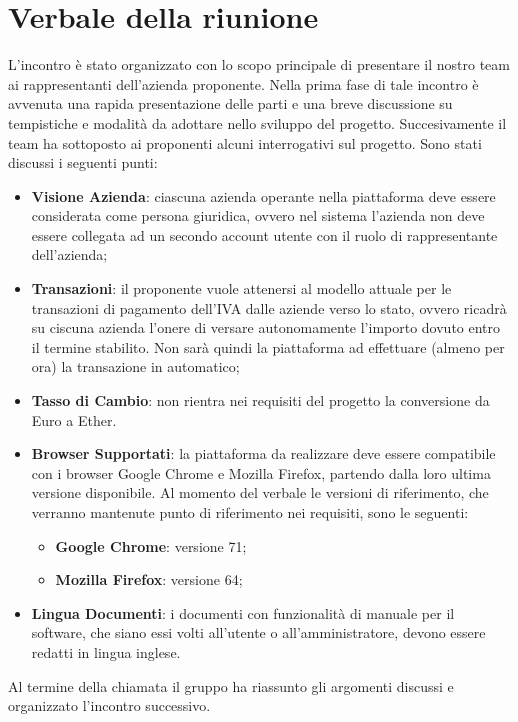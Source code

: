 \section{Verbale della riunione}
L'incontro è stato organizzato con lo scopo principale di presentare il nostro team ai rappresentanti dell'azienda proponente. Nella prima fase di tale incontro è avvenuta una rapida presentazione delle parti e una breve discussione su tempistiche e modalità da adottare nello sviluppo del progetto. Succesivamente il team ha sottoposto ai proponenti alcuni interrogativi sul progetto.
Sono stati discussi i seguenti punti: 
\begin{itemize}
	\item \textbf{Visione Azienda}: ciascuna azienda operante nella piattaforma deve essere considerata come persona giuridica, ovvero nel sistema l'azienda non deve essere collegata ad un secondo account utente con il ruolo di rappresentante dell'azienda;
	\item \textbf{Transazioni}: il proponente vuole attenersi al modello attuale per le transazioni di pagamento dell'IVA dalle aziende verso lo stato, ovvero ricadrà su ciscuna azienda l'onere di versare autonomamente l'importo dovuto entro il termine stabilito. Non sarà quindi la piattaforma ad effettuare (almeno per ora) la transazione in automatico;
	\item \textbf{Tasso di Cambio}: non rientra nei requisiti del progetto la conversione da Euro a Ether.
	\item \textbf{Browser Supportati}: la piattaforma da realizzare deve essere compatibile con i browser Google Chrome e Mozilla Firefox, partendo dalla loro ultima versione disponibile. Al momento del verbale le versioni di riferimento, che verranno mantenute punto di riferimento nei requisiti, sono le seguenti:
	\begin{itemize}
		\item \textbf{Google Chrome}: versione 71;
			\item \textbf{Mozilla Firefox}: versione 64;
	\end{itemize}
	\item \textbf{Lingua Documenti}: i documenti con funzionalità di manuale per il software, che siano essi volti all'utente o all'amministratore, devono essere redatti in lingua inglese.

\end{itemize}
Al termine della chiamata il gruppo ha riassunto gli argomenti discussi e organizzato l'incontro successivo.
